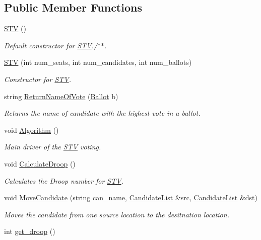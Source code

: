 \subsection*{Public Member Functions}
\begin{DoxyCompactItemize}
\item 
\hyperlink{class_s_t_v_a9ccdab1558b1936150844bbd506b4197}{S\+TV} ()
\begin{DoxyCompactList}\small\item\em Default constructor for \hyperlink{class_s_t_v}{S\+TV}./$\ast$$\ast$. \end{DoxyCompactList}\item 
\hyperlink{class_s_t_v_a07f1d636448505df93a855cf1c25c02a}{S\+TV} (int num\+\_\+seats, int num\+\_\+candidates, int num\+\_\+ballots)
\begin{DoxyCompactList}\small\item\em Constructor for \hyperlink{class_s_t_v}{S\+TV}. \end{DoxyCompactList}\item 
string \hyperlink{class_s_t_v_a05737f758ce07cce32067285d1b388b4}{Return\+Name\+Of\+Vote} (\hyperlink{class_ballot}{Ballot} b)
\begin{DoxyCompactList}\small\item\em Returns the name of candidate with the highest vote in a ballot. \end{DoxyCompactList}\item 
void \hyperlink{class_s_t_v_ac77d6adc39f384482f03ddd9b1977132}{Algorithm} ()\hypertarget{class_s_t_v_ac77d6adc39f384482f03ddd9b1977132}{}\label{class_s_t_v_ac77d6adc39f384482f03ddd9b1977132}

\begin{DoxyCompactList}\small\item\em Main driver of the \hyperlink{class_s_t_v}{S\+TV} voting. \end{DoxyCompactList}\item 
void \hyperlink{class_s_t_v_ac0253d507a1a4897385d0b1b1245beeb}{Calculate\+Droop} ()\hypertarget{class_s_t_v_ac0253d507a1a4897385d0b1b1245beeb}{}\label{class_s_t_v_ac0253d507a1a4897385d0b1b1245beeb}

\begin{DoxyCompactList}\small\item\em Calculates the Droop number for \hyperlink{class_s_t_v}{S\+TV}. \end{DoxyCompactList}\item 
void \hyperlink{class_s_t_v_ae905b9379a145c034f40428618668d57}{Move\+Candidate} (string can\+\_\+name, \hyperlink{class_candidate_list}{Candidate\+List} \&src, \hyperlink{class_candidate_list}{Candidate\+List} \&dst)
\begin{DoxyCompactList}\small\item\em Moves the candidate from one source location to the desitnation location. \end{DoxyCompactList}\item 
int \hyperlink{class_s_t_v_a63c8ba4b45b050ead77a884b1a21e534}{get\+\_\+droop} ()\hypertarget{class_s_t_v_a63c8ba4b45b050ead77a884b1a21e534}{}\label{class_s_t_v_a63c8ba4b45b050ead77a884b1a21e534}


\end{DoxyCompactItemize}
